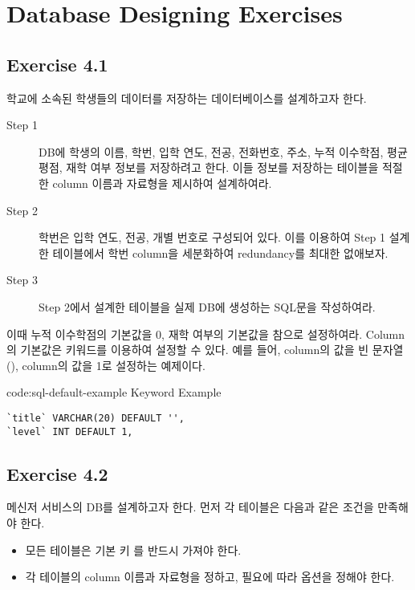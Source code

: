 \section{Database Designing Exercises}\label{sect:database-designing-exercises}

\subsection*{Exercise 4.1}

학교에 소속된 학생들의 데이터를 저장하는 데이터베이스를 설계하고자 한다.

\begin{description}
    \item[Step 1] DB에 학생의 이름, 학번, 입학 연도, 전공, 전화번호, 주소, 누적 이수학점, 평균 평점, 재학 여부 정보를 저장하려고 한다. 이들 정보를 저장하는 테이블을 적절한 column 이름과 자료형을 제시하여 설계하여라. 
    \item[Step 2] 학번은 입학 연도, 전공, 개별 번호로 구성되어 있다. 이를 이용하여 Step 1 설계한 테이블에서 학번 column을 세분화하여 redundancy를 최대한 없애보자.
    \item[Step 3] Step 2에서 설계한 테이블을 실제 DB에 생성하는 SQL문을 작성하여라.
\end{description}

이때 누적 이수학점의 기본값을 0, 재학 여부의 기본값을 참으로 설정하여라. Column의 기본값은  키워드를 이용하여 설정할 수 있다. 예를 들어, \은  column의 값을 빈 문자열(),  column의 값을 1로 설정하는 예제이다.

\begin{codeenv}{code:sql-default-example}{ Keyword Example}\begin{verbatim}
`title` VARCHAR(20) DEFAULT '',
`level` INT DEFAULT 1,
\end{verbatim}
\end{codeenv}

\subsection*{Exercise 4.2}

메신저 서비스의 DB를 설계하고자 한다. 먼저 각 테이블은 다음과 같은 조건을 만족해야 한다.

\begin{itemize}
    \item 모든 테이블은 기본 키 를 반드시 가져야 한다.
    \item 각 테이블의 column 이름과 자료형을 정하고, 필요에 따라 옵션을 정해야 한다.
\end{itemize}

